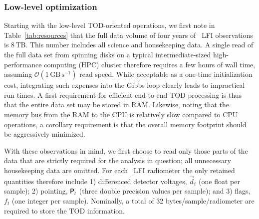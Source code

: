 \documentclass[onecolumn]{aa}
\renewcommand{\d}[0]{\vec{d}}
\renewcommand{\P}[0]{\tens{P}}
\begin{document}
\subsubsection{Low-level optimization}

Starting with the low-level TOD-oriented operations, we first note in
Table~\ref{tab:resources} that the full data volume of four years of
\Planck\ LFI observations is 8\,TB. This number includes all science
and housekeeping data. A single read of the full data set from
spinning disks on a typical intermediate-sized high-performance
computing (HPC) cluster therefore requires a few hours of wall time,
assuming $\mathcal{O}(1\,\mathrm{GB}\,\mathrm{s^{-1}})$ read
speed. While acceptable as a one-time initialization cost, integrating
such expenses into the Gibbs loop clearly leads to impractical run
times. A first requirement for efficient end-to-end TOD processing is
thus that the entire data set may be stored in RAM. Likewise, noting
that the memory bus from the RAM to the CPU is relatively slow
compared to CPU operations, a corollary requirement is that the
overall memory footprint should be aggressively minimized.

With these observations in mind, we first choose to read only those
parts of the data that are strictly required for the analysis in
question; all unnecessary housekeeping data are omitted. For each
\Planck\ LFI radiometer the only retained quantities therefore include
1) differenced detector voltages, $\d_t$ (one float per sample); 2)
pointing, $\P_t$ (three double precision values per sample); and 3)
flags, $f_t$ (one integer per sample). Nominally, a total of 32
bytes/sample/radiometer are required to store the TOD information.
\end{document}
